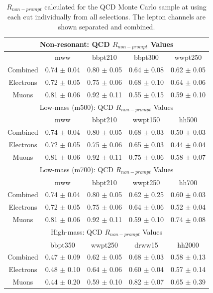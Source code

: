 \begin{table}[h!]
\centering
\begin{tabular}{c|c|c|c|c}

\hline\hline
\multicolumn{5}{c}{Non-resonant: QCD $R_{non-prompt}$ Values}\\\hline\hline 
          & mww                 & bbpt210 	        & bbpt300 	        & wwpt250	        \\ \hline 
Combined  & 0.74 $\pm$ 0.04 	& 0.80 $\pm$ 0.05  	& 0.64 $\pm$ 0.08 	& 0.62 $\pm$ 0.05	\\\hline 
Electrons & 0.72 $\pm$ 0.05  	& 0.75 $\pm$ 0.06 	& 0.68 $\pm$ 0.10 	& 0.64 $\pm$ 0.06	\\\hline 
Muons     & 0.81 $\pm$ 0.06 	& 0.92 $\pm$ 0.11 	& 0.55 $\pm$ 0.15 	& 0.59 $\pm$ 0.10	\\\hline 
\hline\hline
\multicolumn{5}{c}{Low-mass (m500): QCD $R_{non-prompt}$ Values}\\\hline\hline 
          & mww                 & bbpt210 	        & wwpt150 	        & hh500 	        \\ \hline 
Combined  & 0.74 $\pm$ 0.04 	& 0.80 $\pm$ 0.05 	& 0.68 $\pm$ 0.03  	& 0.50 $\pm$ 0.03	\\\hline 
Electrons & 0.72 $\pm$ 0.05 	& 0.75 $\pm$ 0.06 	& 0.65 $\pm$ 0.03 	& 0.44 $\pm$ 0.04	\\\hline 
Muons     & 0.81 $\pm$ 0.06 	& 0.92 $\pm$ 0.11 	& 0.75 $\pm$ 0.06 	& 0.58 $\pm$ 0.07	\\\hline 
\hline\hline

\multicolumn{5}{c}{Low-mass (m700): QCD $R_{non-prompt}$ Values}\\\hline\hline 
          & mww                 & bbpt210 	        & wwpt250 	        & hh700 	        \\ \hline 
Combined  & 0.74 $\pm$ 0.04 	& 0.80 $\pm$ 0.05 	& 0.62 $\pm$ 0.25 	& 0.60 $\pm$ 0.03	\\\hline 
Electrons & 0.72 $\pm$ 0.05 	& 0.75 $\pm$ 0.06 	& 0.64 $\pm$ 0.06 	& 0.52 $\pm$ 0.04	\\\hline 
Muons     & 0.81 $\pm$ 0.06 	& 0.92 $\pm$ 0.11 	& 0.59 $\pm$ 0.10 	& 0.74 $\pm$ 0.08	\\\hline 
\hline\hline


\multicolumn{5}{c}{High-mass: QCD $R_{non-prompt}$ Values}\\\hline\hline 
          & bbpt350             & wwpt250 	        & drww15 	        & hh2000 	        \\ \hline 
Combined  & 0.47 $\pm$ 0.09 	& 0.62 $\pm$ 0.05 	& 0.68 $\pm$ 0.03 	& 0.58 $\pm$ 0.13	\\\hline 
Electrons & 0.48 $\pm$ 0.10 	& 0.64 $\pm$ 0.06 	& 0.60 $\pm$ 0.04 	& 0.57 $\pm$ 0.14	\\\hline 
Muons     & 0.44 $\pm$ 0.20 	& 0.59 $\pm$ 0.10 	& 0.82 $\pm$ 0.07 	& 0.65 $\pm$ 0.39	\\\hline 
\hline\hline


\end{tabular}
\caption{$R_{non-prompt}$ calculated for the QCD Monte Carlo sample at using each cut individually from all selections. The lepton channels are shown separated and combined.}
\label{tab:lepR}
\end{table}
